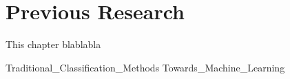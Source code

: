 \chapter{Previous Research} \label{ch:pw}

This chapter blablabla

{Traditional_Classification_Methods}
{Towards_Machine_Learning}